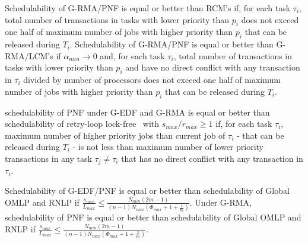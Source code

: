Schedulability of G-RMA/PNF is equal or better than RCM's if, for each task $\tau_i$, total number of transactions in tasks with lower priority than $p_i$ does not exceed one half of maximum number of jobs with higher priority than $p_{i}$ that can be released during $T_{i}$. Schedulability of G-RMA/PNF is equal or better than G-RMA/LCM's if $\alpha_{min}\rightarrow 0$ and, for each task $\tau_i$, total number of transactions in tasks with lower priority than $p_{i}$ and have no direct conflict with any transaction in $\tau_i$ divided by number of processors does not exceed one half of maximum number of jobs with higher priority than $p_{i}$ that can be released during $T_{i}$.

schedulability of PNF under G-EDF and G-RMA is equal or better than schedulability of retry-loop lock-free~\cite{key-5} with $s_{max}/r_{max} \ge 1$ if, for each task $\tau_i$, maximum number of higher priority jobs than current job of $\tau_i$ - that can be released during $T_{i}$ - is not less than maximum number of lower priority transactions in any task $\tau_{j}\neq\tau_{i}$ that has no direct conflict with any transaction in $\tau_{i}$. 

Schedulability of G-EDF/PNF is equal or better than schedulability of Global OMLP and RNLP if $\frac{s_{max}}{L_{max}} \le \frac{N_{min}\left(2m-1\right)}{\left(n-1\right)N_{max}\left(\Phi_{max}+1+\frac{1}{m}\right)}$. Under G-RMA, schedulability of PNF is equal or better than schedulability of Global OMLP and RNLP if $\frac{s_{max}}{L_{max}}\le\frac{N_{min}\left(2m-1\right)}{\left(n-1\right)N_{max}\left(\Phi_{max}+1+\frac{2}{m}\right)}$.